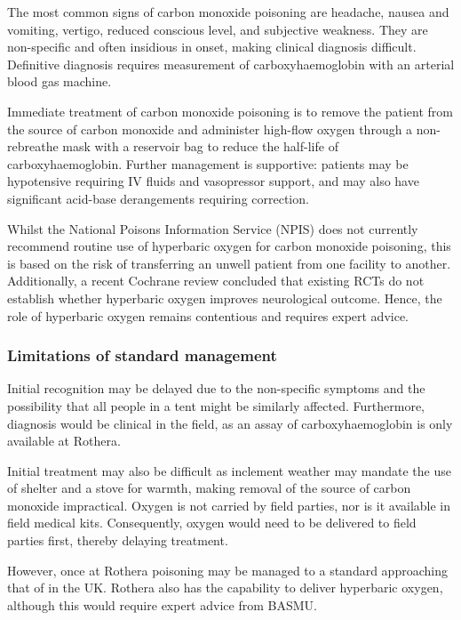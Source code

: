 \documentclass[12pt,a4paper]{article}
\begin{document}
The most common signs of carbon monoxide poisoning are headache, nausea and vomiting, vertigo, reduced conscious level, and subjective weakness.\cite{Anonymous:0VMEfFzn} They are non-specific and often insidious in onset, making clinical diagnosis difficult. Definitive diagnosis requires measurement of carboxyhaemoglobin with an arterial blood gas machine.

Immediate treatment of carbon monoxide poisoning is to remove the patient from the source of carbon monoxide and administer high-flow oxygen through a non-rebreathe mask with a reservoir bag to reduce the half-life of carboxyhaemoglobin.\cite{Anonymous:0VMEfFzn} Further management is supportive: patients may be hypotensive requiring IV fluids and vasopressor support, and may also have significant acid-base derangements requiring correction.

Whilst the National Poisons Information Service (NPIS) does not currently recommend routine use of hyperbaric oxygen for carbon monoxide poisoning, this is based on the risk of transferring an unwell patient from one facility to another.\cite{Anonymous:0VMEfFzn} Additionally, a recent Cochrane review concluded that existing RCTs do not establish whether hyperbaric oxygen improves neurological outcome.\cite{Buckley:2011fe} Hence, the role of hyperbaric oxygen remains contentious and requires expert advice.

\subsubsection{Limitations of standard management}

Initial recognition may be delayed due to the non-specific symptoms and the possibility that all people in a tent might be similarly affected. Furthermore, diagnosis would be clinical in the field, as an assay of carboxyhaemoglobin is only available at Rothera.

Initial treatment may also be difficult as inclement weather may mandate the use of shelter and a stove for warmth, making removal of the source of carbon monoxide impractical. Oxygen is not carried by field parties, nor is it available in field medical kits.\cite{Marquis:2013vg} Consequently, oxygen would need to be delivered to field parties first, thereby delaying treatment.

However, once at Rothera poisoning may be managed to a standard approaching that of in the UK. Rothera also has the capability to deliver hyperbaric oxygen, although this would require expert advice from BASMU.
\end{document}
